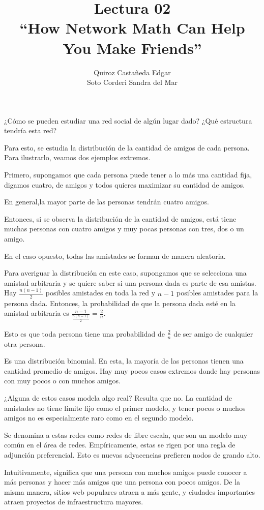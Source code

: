 \documentclass[12pt]{extreport}
\title{
	Lectura 02\\ 
	``How Network Math Can Help You Make Friends''}
\author{
	Quiroz Castañeda Edgar \\
	Soto Corderi Sandra del Mar
	}
\makeatletter
\renewcommand{\maketitle}{
	\bgroup\setlength{\parindent}{0pt}

	\begin{flushright}
		\@author
	\end{flushright}

	\begin{flushleft}
		\textbf{\@title}
	\end{flushleft}

	\egroup
}
\makeatother
\begin{document}
	\maketitle
	
	¿Cómo se pueden estudiar una red social de algún lugar dado? ¿Qué estructura
	tendría esta red?

	Para esto, se estudia la distribución de la cantidad de amigos de cada
	persona. Para ilustrarlo, veamos dos ejemplos extremos.

	Primero, supongamos que cada persona puede tener a lo más una cantidad fija,
	digamos cuatro, de amigos y todos quieres maximizar su cantidad de
	amigos. 

	En general,la mayor parte de las personas tendrán cuatro amigos.

	Entonces, si se observa la distribución de la cantidad de amigos, está tiene
	muchas personas con cuatro amigos y muy pocas personas con tres, dos o un
	amigo.

	En el caso opuesto, todas las amistades se forman de manera aleatoria.

	Para averiguar la distribución en este caso, supongamos que se selecciona 
	una amistad arbitraria y se quiere saber si una persona dada es parte de esa
	amistas. Hay $\frac{n(n-1)}{2}$ posibles amistades en toda la red y $n-1$ 
	posibles amistades para la persona dada. Entonces, la probabilidad de que la
	persona dada esté en la amistad arbitraria es $\frac{n-1}{\frac{n(n-1)}{2}} =
	\frac{2}{n}$.

	Esto es que toda persona tiene una probabilidad de $\frac{2}{n}$ de ser 
	amigo de cualquier otra persona.

	Es una distribución binomial. En esta, la mayoría de las personas tienen una
	cantidad promedio de amigos. Hay muy pocos casos extremos donde hay personas
	con muy pocos o con muchos amigos.
	
	¿Alguna de estos casos modela algo real? Resulta que no. La cantidad de
	amistades no tiene límite fijo como el primer modelo, y tener pocos o muchos
	amigos no es especialmente raro como en el segundo modelo.

	Se denomina a estas redes como redes de libre escala, que son un modelo muy
	común en el área de redes. Empíricamente, estas se rigen por una regla de 
	adjunción preferencial. Esto es nuevas adyacencias prefieren nodos de grando
	alto.

	Intuitivamente, significa que una persona con muchos amigos puede conocer a
	más personas y hacer más amigos que una persona con pocos amigos. De la 
	misma manera, sitios web populares atraen a más gente, y ciudades 
	importantes atraen proyectos de infraestructura mayores.
\end{document}
